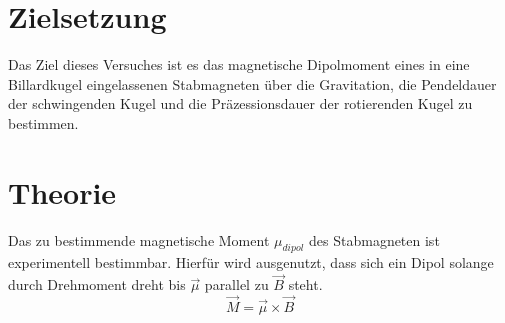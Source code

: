 \section{Zielsetzung}
\label{sec:Zielsetzung}

Das Ziel dieses Versuches ist es das magnetische Dipolmoment eines in eine
Billardkugel eingelassenen Stabmagneten über die Gravitation, die Pendeldauer
der schwingenden Kugel und die Präzessionsdauer der rotierenden Kugel zu bestimmen.


\section{Theorie}
\label{sec:Theorie}

Das zu bestimmende magnetische Moment $\mu_{dipol}$ des Stabmagneten
ist experimentell bestimmbar. Hierfür wird ausgenutzt, dass
sich ein Dipol solange durch Drehmoment dreht bis $\vec{\mu}$
parallel zu $\vec{B}$ steht.
\begin{equation}
  \vec{M} = \vec{\mu} \times \vec{B}
\end{equation}
